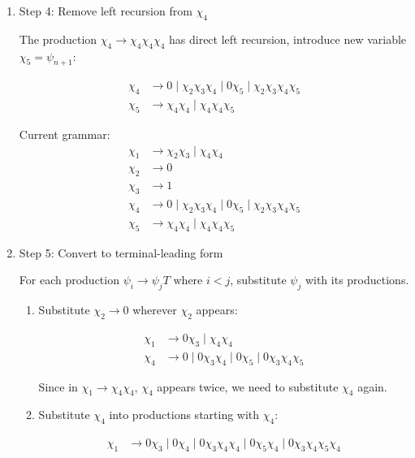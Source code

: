 \documentclass[12pt,a4paper,openany]{article}
\begin{document}
\begin{enumerate}
    \item Step 4: Remove left recursion from $\chi_4$
    
    The production $\chi_4 \to \chi_4\chi_4\chi_4$ has direct left recursion, introduce new variable $\chi_5 = \psi_{n+1}$:

    \begin{align*}
    \chi_4 &\to 0 \mid \chi_2\chi_3\chi_4 \mid 0\chi_5 \mid \chi_2\chi_3\chi_4\chi_5 \\
    \chi_5 &\to \chi_4\chi_4 \mid \chi_4\chi_4\chi_5
    \end{align*}

    Current grammar:
    \begin{align*}
    \chi_1 &\to \chi_2\chi_3 \mid \chi_4\chi_4 \\
    \chi_2 &\to 0 \\
    \chi_3 &\to 1 \\
    \chi_4 &\to 0 \mid \chi_2\chi_3\chi_4 \mid 0\chi_5 \mid \chi_2\chi_3\chi_4\chi_5 \\
    \chi_5 &\to \chi_4\chi_4 \mid \chi_4\chi_4\chi_5
    \end{align*}

    \item Step 5: Convert to terminal-leading form
    
    For each production $\psi_i \to \psi_jT$ where $i < j$, substitute $\psi_j$ with its productions.
    
    \begin{enumerate}

    \item Substitute $\chi_2 \to 0$ wherever $\chi_2$ appears:
    
    \begin{align*}
    \chi_1 &\to 0\chi_3 \mid \chi_4\chi_4 \\
    \chi_4 &\to 0 \mid 0\chi_3\chi_4 \mid 0\chi_5 \mid 0\chi_3\chi_4\chi_5
    \end{align*}
    

    Since in $\chi_1 \to \chi_4\chi_4$, $\chi_4$ appears twice, we need to substitute $\chi_4$ again. 

    \item Substitute $\chi_4$ into productions starting with $\chi_4$:
    
    \begin{align*}
    \chi_1 &\to 0\chi_3 \mid 0\chi_4 \mid 0\chi_3\chi_4\chi_4 \mid 0\chi_5\chi_4 \mid 0\chi_3\chi_4\chi_5\chi_4
    \end{align*}


\end{enumerate}
\end{enumerate}
\end{document}
